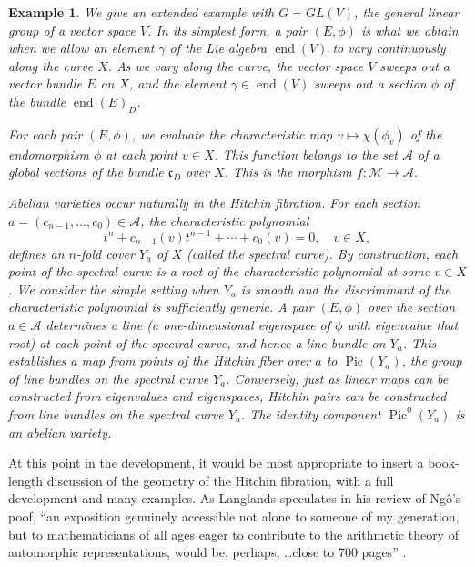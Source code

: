 \documentclass[brochure,english,12pt]{bourbaki}
\theoremstyle{plain}
\newtheorem{example}[equation]{Example}
\def\op#1{{\operatorname{#1}}}
\def\cc{\mathfrak{c}}
\def\A{{\mathcal A}}
\def\M{{\mathcal M}}
\begin{document}
\begin{example} We give an extended example with $G=GL(V)$, the
  general linear group of a vector space $V$.  In its simplest form, a
  pair $(E,\phi)$ is what we obtain when we allow an element $\gamma$ of
  the Lie algebra $\op{end}(V)$ to vary continuously along the curve
  $X$.  As we vary along the curve, the vector space $V$ sweeps out a
  vector bundle $E$ on $X$, and the element $\gamma\in\op{end}(V)$ sweeps
  out a section $\phi$ of the bundle $\op{end}(E)_D$.

  For each pair $(E,\phi)$, we evaluate the characteristic map
  $v\mapsto \chi(\phi_v)$ of the endomorphism $\phi$ at each point
  $v\in X$. This function belongs to the set $\A$ of a global sections
  of the bundle $\cc_D$ over $X$.  This is the morphism $f:{\M}\to
  {\A}$.

  {\it Abelian varieties} occur naturally in the Hitchin fibration.
  For each section $a=(c_{n-1},\ldots,c_0)\in \A$, the characteristic
  polynomial
\begin{equation}\label{eqn:spectral}
t^n + c_{n-1}(v) t^{n-1} + \cdots+ c_0(v)=0,\quad v\in X,
\end{equation} 
defines an $n$-fold cover $Y_a$ of $X$ (called the {\it spectral
  curve}).  By construction, each point of the spectral curve is a
root of the characteristic polynomial at some $v\in X$.  We consider
the simple setting when $Y_a$ is smooth and the discriminant of the
characteristic polynomial is sufficiently generic.  A pair $(E,\phi)$
over the section $a\in\A$ determines a line (a one-dimensional eigenspace
of $\phi$ with eigenvalue that root) at each point of the spectral
curve, and hence a line bundle on $Y_a$.  This establishes a map from
points of the Hitchin fiber over $a$ to $\op{Pic}(Y_a)$, the group of
line bundles on the spectral curve $Y_a$.  Conversely, just as linear
maps can be constructed from eigenvalues and eigenspaces, Hitchin
pairs can be constructed from line bundles on the spectral curve
$Y_a$.  The identity component $\op{Pic}^0(Y_a)$ is an abelian
variety.
\end{example}

At this point in the development, it would be most appropriate to
insert a book-length discussion of the geometry of the Hitchin
fibration, with a full development and many examples.  As Langlands
speculates in his review of Ng\^o's poof, ``an exposition genuinely
accessible not alone to someone of my generation, but to
mathematicians of all ages eager to contribute to the arithmetic
theory of automorphic representations, would be, perhaps, \ldots close
to 700 pages'' \cite{L:Ngo}.
\end{document}
